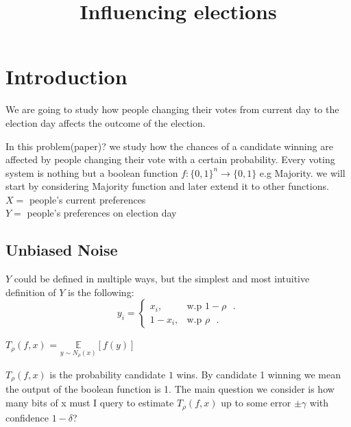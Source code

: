 \documentclass[11pt]{article}
\title{Influencing elections}
\date{}
\begin{document}
\maketitle
\section{Introduction}
We are going to study how people changing their votes from current day to the election day affects the outcome of the election. 

In this problem(paper)? we study how the chances of a candidate winning are affected by people changing their vote with a certain probability. %
Every voting system is nothing but a boolean function 
 $f:\{0,1\}^{n} \rightarrow \{0,1\}$ e.g Majority.
we will start by considering Majority function and later extend it to other functions.\\
\noindent
 $X =$  people's current preferences \\ \noindent
 $Y =$  people's preferences on election day

\subsection{Unbiased Noise}

$Y$ could be defined in multiple ways, but the simplest and most intuitive definition of $Y$ is the following:
\begin{equation*}
 y_i  =\begin{cases}
 x_i , & \text{w.p  $1-\rho$ }.\\
 1-x_i , & \text{w.p  $\rho$ }.
\end{cases}
\end{equation*}

 \BD $T_{\rho}(f,x)$ = $\underset{y \sim N_{\rho}(x)}{\mathbb{E}}[f(y)]$ 
 \ED 
 
\noindent $T_{\rho}(f,x)$ is the probability candidate $1$ wins. By candidate 1 winning we mean the output of the boolean function is 1. The main question we consider is how many bits of x must I query to estimate $T_{\rho}(f,x)$ up to some error $\pm \gamma $ with confidence $1-\delta$? 
\end{document}
